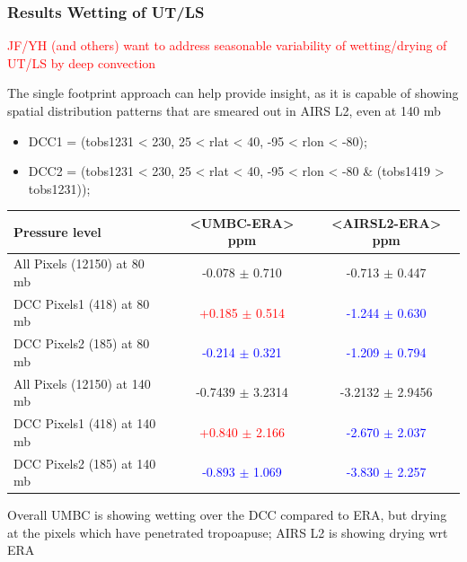 \documentclass[10pt,t]{beamer}
\begin{document}
\begin{frame}
\frametitle{Results Wetting of UT/LS}

\vspace{-0.05in}
  \textcolor{red}{JF/YH (and others) want to address seasonable
  variability of wetting/drying of UT/LS by deep convection} \newline

\vspace{-0.1in}
The single footprint approach can help provide insight, as it is
capable of showing spatial distribution patterns that are smeared out
in AIRS L2, even at 140 mb
   
\vspace{-0.05in}  
  \begin{small}
  \begin{itemize}    
  \item DCC1 = (tobs1231 < 230, 25 < rlat < 40, -95 < rlon < -80);
  \item DCC2 = (tobs1231 < 230, 25 < rlat < 40, -95 < rlon < -80 \& (tobs1419 > tobs1231));  
 \end{itemize}
 \end{small}
\vspace{-0.15in}
  \begin{small}
    \begin{table}[h]
      \begin{center}
        \begin{tabular}{lcc}
          \hline
          Pressure level & <UMBC-ERA> ppm  & <AIRSL2-ERA> ppm \\
          \hline
          All Pixels  (12150) at 80 mb & -0.078 $\pm$ 0.710  & -0.713 $\pm$ 0.447 \\
          DCC Pixels1  (418)   at 80 mb & \textcolor{red}{+0.185 $\pm$ 0.514}  & \textcolor{blue}{-1.244 $\pm$ 0.630} \\
          DCC Pixels2 (185)   at 80 mb & \textcolor{blue}{-0.214 $\pm$ 0.321}  & \textcolor{blue}{-1.209 $\pm$ 0.794} \\
          \hline
          All Pixels  (12150) at 140 mb & -0.7439 $\pm$ 3.2314  & -3.2132 $\pm$ 2.9456 \\
          DCC Pixels1  (418)   at 140 mb & \textcolor{red}{+0.840 $\pm$ 2.166}  & \textcolor{blue}{-2.670 $\pm$ 2.037} \\
          DCC Pixels2 (185)   at 140 mb & \textcolor{blue}{-0.893 $\pm$ 1.069}  & \textcolor{blue}{-3.830 $\pm$ 2.257} \\  
          \hline
        \end{tabular}
      \end{center}
    \end{table}
  \end{small}

\begin{small}
Overall UMBC is showing wetting over the DCC compared to ERA, but drying at the pixels which have penetrated tropoapuse; AIRS L2
is showing drying wrt ERA
\end{small}
\end{frame}
\end{document}
